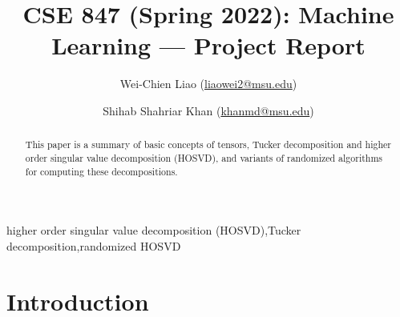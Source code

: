 \documentclass[preprint]{elsarticle}
\title{\textbf{\large{CSE 847 (Spring 2022): Machine Learning --- Project Report}}}
\author[1]{Wei-Chien Liao (\href{mailto:liaowei2@msu.edu}{liaowei2@msu.edu})}
\author[1]{Shihab Shahriar Khan (\href{mailto:khanmd@msu.edu}{khanmd@msu.edu})}
\date{}
\begin{document}
\begin{frontmatter}
\begin{abstract}
    This paper is a summary of basic concepts of tensors, Tucker decomposition and higher order singular value decomposition (HOSVD), and variants
    of randomized algorithms for computing these decompositions.
\end{abstract}
\begin{keyword}
    higher order singular value decomposition (HOSVD)\sep Tucker decomposition\sep randomized HOSVD
\end{keyword}
\end{frontmatter}
\section{Introduction}
\end{document}
